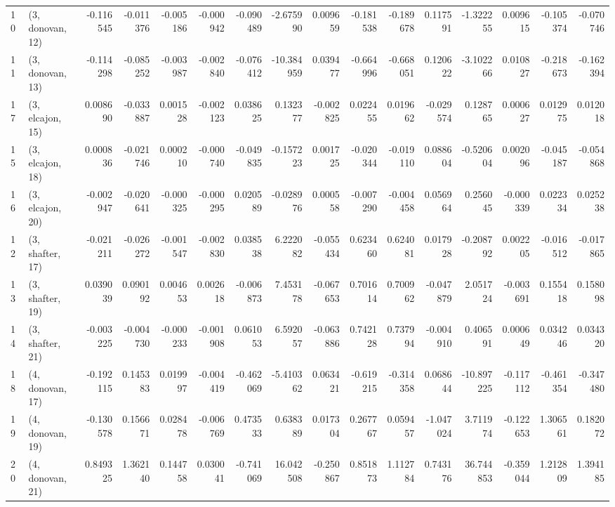 \begin{tabular}{llrrrrrrrrrrrrrr}
10 &  (3, donovan, 12) & -0.116545 & -0.011376 &  -0.005186 & -0.000942 & -0.090489 &  -2.675990 &  0.009659 &  -0.181538 & -0.189678 &  0.117591 &  -1.322255 &  0.009615 & -0.105374 & -0.070746 \\
11 &  (3, donovan, 13) & -0.114298 & -0.085252 &  -0.003987 & -0.002840 & -0.076412 & -10.384959 &  0.039477 &  -0.664996 & -0.668051 &  0.120622 &  -3.102266 &  0.010827 & -0.218673 & -0.162394 \\
17 &  (3, elcajon, 15) &  0.008690 & -0.033887 &   0.001528 & -0.002123 &  0.038625 &   0.132377 & -0.002825 &   0.022455 &  0.019662 & -0.029574 &   0.128765 &  0.000627 &  0.012975 &  0.012018 \\
15 &  (3, elcajon, 18) &  0.000836 & -0.021746 &   0.000210 & -0.000740 & -0.049835 &  -0.157223 &  0.001725 &  -0.020344 & -0.019110 &  0.088604 &  -0.520604 &  0.002096 & -0.045187 & -0.054868 \\
16 &  (3, elcajon, 20) & -0.002947 & -0.020641 &  -0.000325 & -0.000295 &  0.020589 &  -0.028976 &  0.000558 &  -0.007290 & -0.004458 &  0.056964 &   0.256045 & -0.000339 &  0.022334 &  0.025238 \\
12 &  (3, shafter, 17) & -0.021211 & -0.026272 &  -0.001547 & -0.002830 &  0.038538 &   6.222082 & -0.055434 &   0.623460 &  0.624081 &  0.017928 &  -0.208792 &  0.002205 & -0.016512 & -0.017865 \\
13 &  (3, shafter, 19) &  0.039039 &  0.090192 &   0.004653 &  0.002618 & -0.006873 &   7.453178 & -0.067653 &   0.701614 &  0.700962 & -0.047879 &   2.051724 & -0.003691 &  0.155418 &  0.158098 \\
14 &  (3, shafter, 21) & -0.003225 & -0.004730 &  -0.000233 & -0.001908 &  0.061053 &   6.592057 & -0.063886 &   0.742128 &  0.737994 & -0.004910 &   0.406591 &  0.000649 &  0.034246 &  0.034320 \\
18 &  (4, donovan, 17) & -0.192115 &  0.145383 &   0.019997 & -0.004419 & -0.462069 &  -5.410362 &  0.063421 &  -0.619215 & -0.314358 &  0.068644 & -10.897225 & -0.117112 & -0.461354 & -0.347480 \\
19 &  (4, donovan, 19) & -0.130578 &  0.156671 &   0.028478 & -0.006769 &  0.473533 &   0.638389 &  0.017304 &   0.267767 &  0.059457 & -1.047024 &   3.711974 & -0.122653 &  1.306561 &  0.182072 \\
20 &  (4, donovan, 21) &  0.849325 &  1.362140 &   0.144758 &  0.030041 & -0.741069 &  16.042508 & -0.250867 &   0.851873 &  1.112784 &  0.743176 &  36.744853 & -0.359044 &  1.212809 &  1.394185 \\

\end{tabular}
